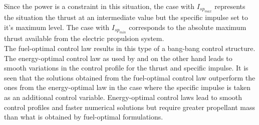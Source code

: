 Since the power is a constraint in this situation, the case with $I_{sp_{max}}$ represents the situation the thrust at an intermediate value but the specific impulse set to it's maximum level. The case with $I_{sp_{min}}$ corresponds to the absolute maximum thrust available from the electric propulsion system.\\
The fuel-optimal control law results in this type of a bang-bang control structure. The energy-optimal control law as used by \cite{genta_optimal_2016} and \cite{nah_fuel-optimal_2001} on the other hand leads to smooth variations in the control profile for the thrust and specific impulse. It is seen that the solutions obtained from the fuel-optimal control law outperform the ones from the energy-optimal law in the case where the specific impulse is taken as an additional control variable. Energy-optimal control laws lead to smooth control profiles and faster numerical solutions but require greater propellant mass than what is obtained by fuel-optimal formulations.